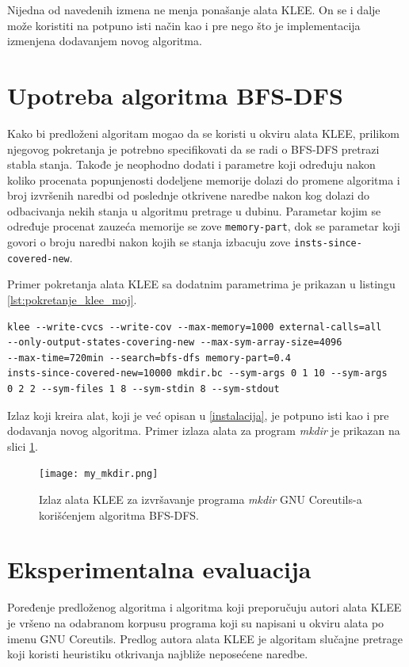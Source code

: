 \documentclass[12pt,oneside]{memoir}
\begin{document}
Nijedna od navedenih izmena ne menja ponašanje alata KLEE. On se i dalje može koristiti na potpuno isti način kao i pre nego što je implementacija izmenjena dodavanjem novog algoritma.

\section{Upotreba algoritma BFS-DFS}

Kako bi predloženi algoritam mogao da se koristi u okviru alata KLEE, prilikom njegovog pokretanja je potrebno specifikovati da se radi o BFS-DFS pretrazi stabla stanja. Takođe je neophodno dodati i parametre koji određuju nakon koliko procenata popunjenosti dodeljene memorije dolazi do promene algoritma i broj izvršenih naredbi od poslednje otkrivene naredbe nakon kog dolazi do odbacivanja nekih stanja u algoritmu pretrage u dubinu. Parametar kojim se određuje procenat zauzeća memorije se zove \texttt{memory-part}, dok se parametar koji govori o broju naredbi nakon kojih se stanja izbacuju zove \texttt{insts-since-covered-new}. 

Primer pokretanja alata KLEE sa dodatnim parametrima je prikazan u listingu \ref{lst:pokretanje_klee_moj}.

\begin{lstlisting}[caption={Primer pokretanja alata KLEE gde se za pretragu stabla stanja koristi algoritam BFS-DFS}, label={lst:pokretanje_klee_moj}, captionpos=b]
klee --write-cvcs --write-cov --max-memory=1000 external-calls=all
--only-output-states-covering-new --max-sym-array-size=4096 
--max-time=720min --search=bfs-dfs memory-part=0.4 
insts-since-covered-new=10000 mkdir.bc --sym-args 0 1 10 --sym-args 
0 2 2 --sym-files 1 8 --sym-stdin 8 --sym-stdout

\end{lstlisting}

Izlaz koji kreira alat, koji je već opisan u \ref{instalacija}, je potpuno isti kao i pre dodavanja novog algoritma. Primer izlaza alata za program \textit{mkdir} je prikazan na slici \ref{fig:my_mkdir}.

\begin{figure}[ht]
    \centering
    \texttt{[image: my\_mkdir.png]}
    \caption{Izlaz alata KLEE za izvršavanje programa \textit{mkdir} GNU Coreutils-a korišćenjem algoritma BFS-DFS.}
    \label{fig:my_mkdir}
\end{figure}

\section{Eksperimentalna evaluacija}
Poređenje predloženog algoritma i algoritma koji preporučuju autori alata KLEE je vršeno na odabranom korpusu programa koji su napisani u okviru alata po imenu GNU Coreutils. Predlog autora alata KLEE \cite{klee} je algoritam slučajne pretrage koji koristi heuristiku otkrivanja najbliže neposećene naredbe. 
\end{document}
